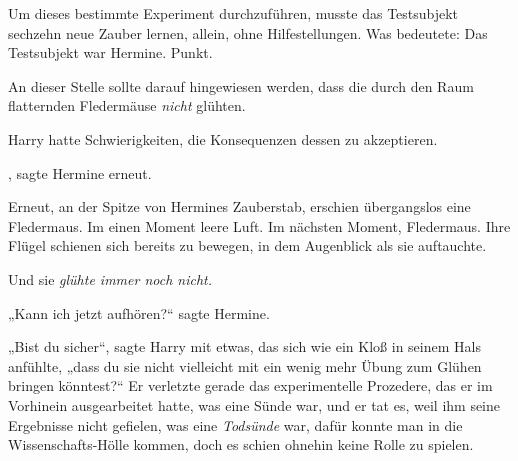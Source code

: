Um dieses bestimmte Experiment durchzuführen, musste das Testsubjekt sechzehn neue Zauber lernen, allein, ohne Hilfestellungen. Was bedeutete: Das Testsubjekt war Hermine. Punkt.

An dieser Stelle sollte darauf hingewiesen werden, dass die durch den Raum flatternden Fledermäuse \emph{nicht} glühten.

Harry hatte Schwierigkeiten, die Konsequenzen dessen zu akzeptieren.

, sagte Hermine erneut.

Erneut, an der Spitze von Hermines Zauberstab, erschien übergangslos eine Fledermaus. Im einen Moment leere Luft. Im nächsten Moment, Fledermaus. Ihre Flügel schienen sich bereits zu bewegen, in dem Augenblick als sie auftauchte.

Und sie \emph{glühte immer noch nicht.}

„Kann ich jetzt aufhören?“ sagte Hermine.

„Bist du sicher“, sagte Harry mit etwas, das sich wie ein Kloß in seinem Hals anfühlte, „dass du sie nicht vielleicht mit ein wenig mehr Übung zum Glühen bringen könntest?“ Er verletzte gerade das experimentelle Prozedere, das er im Vorhinein ausgearbeitet hatte, was eine Sünde war, und er tat es, weil ihm seine Ergebnisse nicht gefielen, was eine \emph{Todsünde} war, dafür konnte man in die Wissenschafts-Hölle kommen, doch es schien ohnehin keine Rolle zu spielen.

